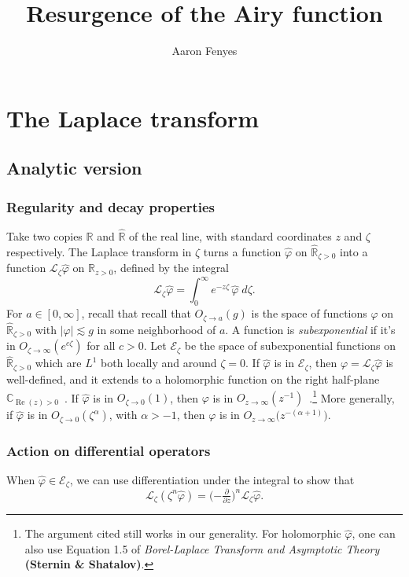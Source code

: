 \documentclass{article}
\title{Resurgence of the Airy function}
\author{Aaron Fenyes}
\newcommand{\R}{\mathbb{R}}
\newcommand{\C}{\mathbb{C}}
\newcommand{\laplace}{\mathcal{L}}
\begin{document}
\maketitle
\section{The Laplace transform}
\subsection{Analytic version}
\subsubsection{Regularity and decay properties}\label{reg-decay}
Take two copies $\R$ and $\hat{\R}$ of the real line, with standard coordinates $z$ and $\zeta$ respectively. The Laplace transform in $\zeta$ turns a function $\hat{\varphi}$ on $\hat{\R}_{\zeta > 0}$ into a function $\laplace_\zeta \hat{\varphi}$ on $\R_{z > 0}$, defined by the integral
\[ \laplace_\zeta \hat{\varphi} = \int_0^\infty e^{-z \zeta}\,\hat{\varphi}\;d\zeta. \]
For $a \in [0, \infty]$, recall that recall that $O_{\zeta \to a}(g)$ is the space of functions $\varphi$ on $\hat{\R}_{\zeta > 0}$ with $|\varphi| \lesssim g$ in some neighborhood of $a$. A function is {\em subexponential} if it's in $O_{\zeta \to \infty}(e^{c\zeta})$ for all $c > 0$. Let $\mathcal{E}_\zeta$ be the space of subexponential functions on $\hat{\R}_{\zeta > 0}$ which are $L^1$ both locally and around $\zeta = 0$. If $\hat{\varphi}$ is in $\mathcal{E}_\zeta$, then $\varphi = \laplace_\zeta \hat{\varphi}$ is well-defined, and it extends to a holomorphic function on the right half-plane $\C_{\operatorname{Re}(z) > 0}$~\cite[\S 5.6]{diverg-resurg-i}. If $\hat{\varphi}$ is in $O_{\zeta \to 0}(1)$, then $\varphi$ is in $O_{z \to \infty}(z^{-1})$~\cite[equation~1.8]{laplace-tfm}.\footnote{The argument cited still works in our generality. For holomorphic $\hat{\varphi}$, one can also use Equation 1.5 of {\em Borel-Laplace Transform and Asymptotic Theory} \textbf{(Sternin \& Shatalov)}.} More generally, if $\hat{\varphi}$ is in $O_{\zeta \to 0}(\zeta^{\alpha})$, with $\alpha > -1$, then $\varphi$ is in $O_{z \to \infty}\big(z^{-(\alpha + 1)}\big)$.
\subsubsection{Action on differential operators}\label{L-diff-op}
When $\hat{\varphi} \in \mathcal{E}_\zeta$, we can use differentiation under the integral to show that~\cite[Theorem~1.34]{laplace-tfm}
\begin{equation}\label{id:L-mult}
\laplace_\zeta (\zeta^n \hat{\varphi}) = \big({-\tfrac{\partial}{\partial z}}\big)^n \laplace_\zeta \hat{\varphi}.
\end{equation}
\end{document}
